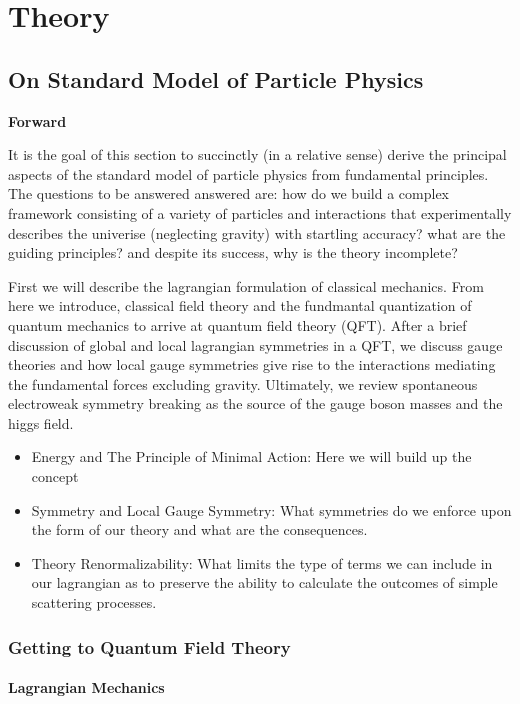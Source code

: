 \chapter{Theory}

\section{On Standard Model of Particle Physics}

\textbf{Forward}

It is the goal of this section to succinctly (in a relative sense) derive the 
principal aspects of the  standard model of particle physics from fundamental principles. 
The questions to be answered answered are: how do we build a complex framework consisting of 
a variety of particles and interactions that  experimentally describes the univerise (neglecting
 gravity) with startling accuracy? what are the guiding principles? and despite its success, why
is the theory incomplete?

First we will describe the lagrangian formulation of classical mechanics. From here we introduce, 
classical field theory and the fundmantal quantization of quantum mechanics to arrive at quantum field
theory (QFT). After a brief discussion of global and local lagrangian symmetries in a QFT, we discuss
gauge theories and how local gauge symmetries give rise to the interactions mediating the 
fundamental forces excluding gravity. Ultimately, we review spontaneous 
electroweak symmetry breaking as the source of the gauge boson masses and the higgs field. 

\begin{itemize}
\item Energy and The Principle of Minimal Action: Here we will build up the concept
\item Symmetry and Local Gauge Symmetry: What symmetries do we enforce upon the form of our theory
and what are the consequences.
\item Theory Renormalizability: What limits the type of terms we can include in our lagrangian as to preserve
the ability to calculate the outcomes of simple scattering processes. 
\end{itemize}

\subsection{Getting to Quantum Field Theory}

\subsubsection{Lagrangian Mechanics}


